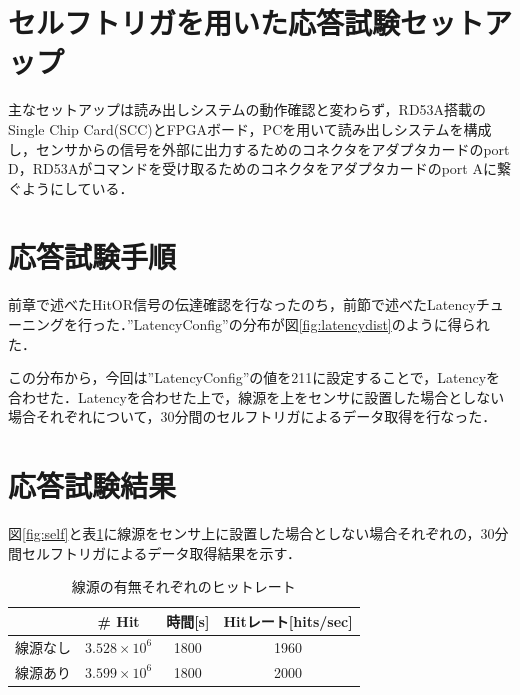 \section{セルフトリガを用いた応答試験セットアップ}
\label{sec:selfsetup}
主なセットアップは読み出しシステムの動作確認と変わらず，RD53A搭載のSingle Chip Card(SCC)とFPGAボード，PCを用いて読み出しシステムを構成し，センサからの信号を外部に出力するためのコネクタをアダプタカードのport D，RD53Aがコマンドを受け取るためのコネクタをアダプタカードのport Aに繋ぐようにしている．

\section{応答試験手順}
\label{sec:selfhow}
前章で述べたHitOR信号の伝達確認を行なったのち，前節で述べたLatencyチューニングを行った．''LatencyConfig''の分布が図\ref{fig:latencydist}のように得られた．\par
この分布から，今回は''LatencyConfig''の値を211に設定することで，Latencyを合わせた．Latencyを合わせた上で，線源を上をセンサに設置した場合としない場合それぞれについて，30分間のセルフトリガによるデータ取得を行なった．

\section{応答試験結果}
\label{sec:selfconc}
図\ref{fig:self}と表\ref{tab:self}に線源をセンサ上に設置した場合としない場合それぞれの，30分間セルフトリガによるデータ取得結果を示す．

\begin{table}[h]
  \centering
  \caption{線源の有無それぞれのヒットレート}
  \begin{tabular} {|l|c|c||c|} \hline
     & \# Hit & 時間[s] & Hitレート[hits/sec] \\  \hline
    線源なし & $3.528 \times 10^6$ & 1800 & 1960 \\ 
    線源あり & $3.599 \times 10^6$ & 1800 & 2000 \\ \hline
  \end{tabular}
  \label{tab:self}
\end{table}


